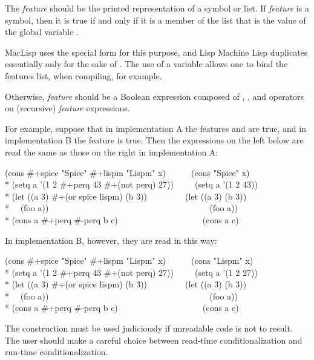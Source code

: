 \begin{flushdesc}
The \emph{feature} should be the printed representation of a symbol or list.
If \emph{feature} is a symbol, then 
it is true if and only if it is a member of the list that is the value of
the global variable .

\beforenoterule
\begin{incompatibility}
MacLisp uses the  special form for
this purpose, and Lisp Machine Lisp duplicates  essentially only
for the sake of .  The use of a variable allows
one to bind the features list, when compiling, for example.
\end{incompatibility}
\afternoterule

Otherwise,
\emph{feature} should be a Boolean expression composed of , , and
 operators on (recursive) \emph{feature} expressions.

For example, suppose that in implementation A the features  and
 are true, and in implementation B the feature  is true.
Then the expressions on the left below are read the same as those on the
right in implementation A:
\begin{lisp}
(cons \#+spice "Spice" \#+lispm "Lispm" x)~~~~~~(cons "Spice" x) \\*
(setq a '(1 2 \#+perq 43 \#+(not perq) 27))~~~~~(setq a '(1 2 43)) \\*
(let ((a 3) \#+(or spice lispm) (b 3))~~~~~~~~~(let ((a 3) (b 3)) \\*
~~(foo a))~~~~~~~~~~~~~~~~~~~~~~~~~~~~~~~~~~~~~~(foo a))\\*
(cons a \#+perq \#-perq b c)~~~~~~~~~~~~~~~~~~~~(cons a c)
\end{lisp}
In implementation B, however, they are read in this way:
\begin{lisp}
(cons \#+spice "Spice" \#+lispm "Lispm" x)~~~~~~(cons "Lispm" x) \\*
(setq a '(1 2 \#+perq 43 \#+(not perq) 27))~~~~~(setq a '(1 2 27)) \\*
(let ((a 3) \#+(or spice lispm) (b 3))~~~~~~~~~(let ((a 3) (b 3)) \\*
~~(foo a))~~~~~~~~~~~~~~~~~~~~~~~~~~~~~~~~~~~~~~(foo a))\\*
(cons a \#+perq \#-perq b c)~~~~~~~~~~~~~~~~~~~~(cons a c)
\end{lisp}

\newpage%

The \cd{\#+} construction must be used judiciously if unreadable code is
not to result.  The user should make a careful choice between read-time
conditionalization and run-time conditionalization.


\end{flushdesc}
